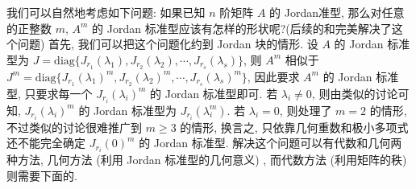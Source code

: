 \documentclass[../../main.tex]{subfiles}%
\begin{document}
我们可以自然地考虑如下问题: 如果已知 $n$ 阶矩阵 $A$ 的 Jordan准型, 那么对任意的正整数 $m$, $A^m$ 的 Jordan 标准型应该有怎样的形状呢?(后续的和完美解决了这个问题) 首先, 我们可以把这个问题化约到 Jordan 块的情形. 设 $A$ 的 Jordan 标准型为 $J = \mathrm{diag}\{J_{r_1}(\lambda_1),J_{r_2}(\lambda_2),\cdots,J_{r_s}(\lambda_s)\}$, 则 $A^m$ 相似于 $J^m = \mathrm{diag}\{J_{r_1}(\lambda_1)^m,J_{r_2}(\lambda_2)^m,\cdots,J_{r_s}(\lambda_s)^m\}$, 因此要求 $A^m$ 的 Jordan 标准型, 只要求每一个 $J_{r_i}(\lambda_i)^m$ 的 Jordan 标准型即可. 若 $\lambda_i \neq 0$, 则由类似的讨论可知, $J_{r_i}(\lambda_i)^m$ 的 Jordan 标准型为 $J_{r_i}(\lambda_i^m)$. 若 $\lambda_i = 0$, 则处理了 $m = 2$ 的情形, 不过类似的讨论很难推广到 $m \geqslant  3$ 的情形, 换言之, 只依靠几何重数和极小多项式还不能完全确定 $J_{r_i}(0)^m$ 的 Jordan 标准型. 解决这个问题可以有代数和几何两种方法, 几何方法 (利用 Jordan 标准型的几何意义) , 而代数方法 (利用矩阵的秩) 则需要下面的.
\end{document}
